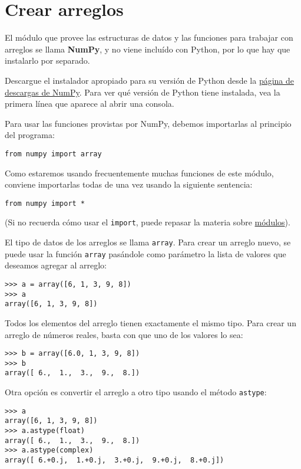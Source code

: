\section{Crear arreglos}

El módulo que provee las estructuras de datos y las funciones para
trabajar con arreglos se llama \textbf{NumPy}, y no viene incluído con
Python, por lo que hay que instalarlo por separado.

Descargue el instalador apropiado para su versión de Python desde la
\href{http://tinyurl.com/bajar-numpy}{página de descargas de NumPy}.
Para ver qué versión de Python tiene instalada, vea la primera línea que
aparece al abrir una consola.

Para usar las funciones provistas por NumPy, debemos importarlas al
principio del programa:

\begin{lstlisting}
from numpy import array
\end{lstlisting}

Como estaremos usando frecuentemente muchas funciones de este módulo,
conviene importarlas todas de una vez usando la siguiente sentencia:

\begin{lstlisting}
from numpy import *
\end{lstlisting}

(Si no recuerda cómo usar el \lstinline!import!, puede repasar la
materia sobre \href{modulos.html}{módulos}).

El tipo de datos de los arreglos se llama \lstinline!array!. Para crear
un arreglo nuevo, se puede usar la función \lstinline!array! pasándole
como parámetro la lista de valores que deseamos agregar al arreglo:

\begin{lstlisting}
>>> a = array([6, 1, 3, 9, 8])
>>> a
array([6, 1, 3, 9, 8])
\end{lstlisting}

Todos los elementos del arreglo tienen exactamente el mismo tipo. Para
crear un arreglo de números reales, basta con que uno de los valores lo
sea:

\begin{lstlisting}
>>> b = array([6.0, 1, 3, 9, 8])
>>> b
array([ 6.,  1.,  3.,  9.,  8.])
\end{lstlisting}

Otra opción es convertir el arreglo a otro tipo usando el método
\lstinline!astype!:

\begin{lstlisting}
>>> a
array([6, 1, 3, 9, 8])
>>> a.astype(float)
array([ 6.,  1.,  3.,  9.,  8.])
>>> a.astype(complex)
array([ 6.+0.j,  1.+0.j,  3.+0.j,  9.+0.j,  8.+0.j])
\end{lstlisting}

